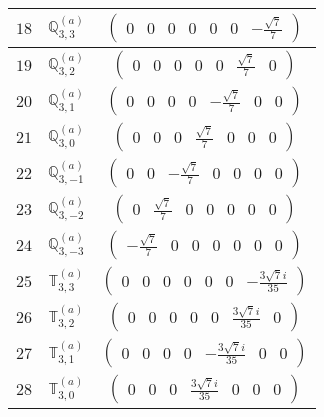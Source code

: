 \documentclass[fleqn,8pt,landscape]{jsarticle}
\begin{document}
\begin{center}
\begin{longtable}{ccc}
$ 18 $ & $ \mathbb{Q}_{3,3}^{(a)} $ & $ \begin{pmatrix} 0 & 0 & 0 & 0 & 0 & 0 & - \frac{\sqrt{7}}{7} \end{pmatrix} $ \\ \hline
$ 19 $ & $ \mathbb{Q}_{3,2}^{(a)} $ & $ \begin{pmatrix} 0 & 0 & 0 & 0 & 0 & \frac{\sqrt{7}}{7} & 0 \end{pmatrix} $ \\ \hline
$ 20 $ & $ \mathbb{Q}_{3,1}^{(a)} $ & $ \begin{pmatrix} 0 & 0 & 0 & 0 & - \frac{\sqrt{7}}{7} & 0 & 0 \end{pmatrix} $ \\ \hline
$ 21 $ & $ \mathbb{Q}_{3,0}^{(a)} $ & $ \begin{pmatrix} 0 & 0 & 0 & \frac{\sqrt{7}}{7} & 0 & 0 & 0 \end{pmatrix} $ \\ \hline
$ 22 $ & $ \mathbb{Q}_{3,-1}^{(a)} $ & $ \begin{pmatrix} 0 & 0 & - \frac{\sqrt{7}}{7} & 0 & 0 & 0 & 0 \end{pmatrix} $ \\ \hline
$ 23 $ & $ \mathbb{Q}_{3,-2}^{(a)} $ & $ \begin{pmatrix} 0 & \frac{\sqrt{7}}{7} & 0 & 0 & 0 & 0 & 0 \end{pmatrix} $ \\ \hline
$ 24 $ & $ \mathbb{Q}_{3,-3}^{(a)} $ & $ \begin{pmatrix} - \frac{\sqrt{7}}{7} & 0 & 0 & 0 & 0 & 0 & 0 \end{pmatrix} $ \\ \hline
$ 25 $ & $ \mathbb{T}_{3,3}^{(a)} $ & $ \begin{pmatrix} 0 & 0 & 0 & 0 & 0 & 0 & - \frac{3 \sqrt{7} i}{35} \end{pmatrix} $ \\ \hline
$ 26 $ & $ \mathbb{T}_{3,2}^{(a)} $ & $ \begin{pmatrix} 0 & 0 & 0 & 0 & 0 & \frac{3 \sqrt{7} i}{35} & 0 \end{pmatrix} $ \\ \hline
$ 27 $ & $ \mathbb{T}_{3,1}^{(a)} $ & $ \begin{pmatrix} 0 & 0 & 0 & 0 & - \frac{3 \sqrt{7} i}{35} & 0 & 0 \end{pmatrix} $ \\ \hline
$ 28 $ & $ \mathbb{T}_{3,0}^{(a)} $ & $ \begin{pmatrix} 0 & 0 & 0 & \frac{3 \sqrt{7} i}{35} & 0 & 0 & 0 \end{pmatrix} $ \\ \hline

\end{longtable}
\end{center}
\end{document}

